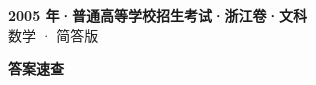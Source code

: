 \documentclass[zihao=-4, a4paper]{ctexart}
\begin{document}
\begin{center}
  {\Large\bfseries 2005 年·普通高等学校招生考试·浙江卷·文科}\\[4pt]
  {\large 数学 · 简答版}
\end{center}
\medskip
{}

\clearpage
{}
\begin{center}{\Large\bfseries 答案速查}\end{center}
\medskip

\end{document}
